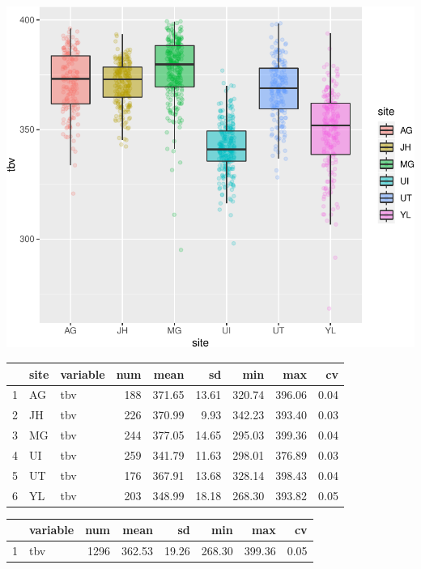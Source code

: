 \documentclass[
]{article}
\begin{document}
\begin{center}\includegraphics{paper_files/figure-latex/plot_tbv-1} \end{center}

\begin{table}[ht]
\centering
\begin{tabular}{rllrrrrrr}
  \hline
 & site & variable & num & mean & sd & min & max & cv \\ 
  \hline
1 & AG & tbv & 188 & 371.65 & 13.61 & 320.74 & 396.06 & 0.04 \\ 
  2 & JH & tbv & 226 & 370.99 & 9.93 & 342.23 & 393.40 & 0.03 \\ 
  3 & MG & tbv & 244 & 377.05 & 14.65 & 295.03 & 399.36 & 0.04 \\ 
  4 & UI & tbv & 259 & 341.79 & 11.63 & 298.01 & 376.89 & 0.03 \\ 
  5 & UT & tbv & 176 & 367.91 & 13.68 & 328.14 & 398.43 & 0.04 \\ 
  6 & YL & tbv & 203 & 348.99 & 18.18 & 268.30 & 393.82 & 0.05 \\ 
   \hline
\end{tabular}
\end{table}
\begin{table}[ht]
\centering
\begin{tabular}{rlrrrrrr}
  \hline
 & variable & num & mean & sd & min & max & cv \\ 
  \hline
1 & tbv & 1296 & 362.53 & 19.26 & 268.30 & 399.36 & 0.05 \\ 
   \hline
\end{tabular}
\end{table}
\end{document}
